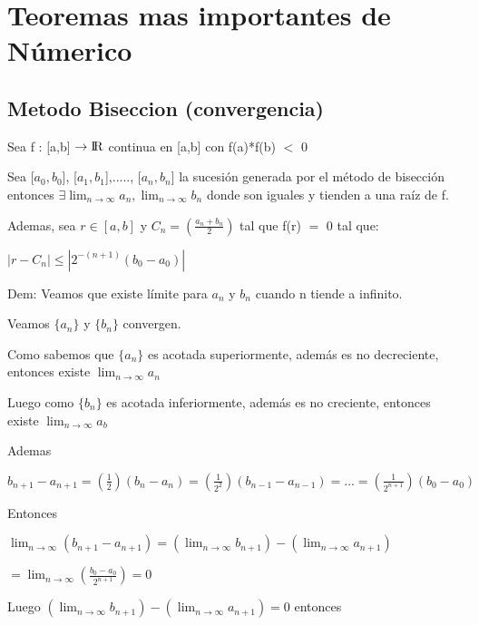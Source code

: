 \documentclass{article}
\begin{document}
\section{Teoremas mas importantes de Númerico}\label{Teoremas}

\subsection{Metodo Biseccion (convergencia)}\label{Metodo-Biseccion-(convergencia)}

Sea f : [a,b] $ \rightarrow {\rm I\!R}$ continua en [a,b] con f(a)*f(b) $<$ 0

Sea [$a_0,b_0$], [$a_1,b_1$],....., [$a_n,b_n$] la sucesión generada por el método de bisección entonces
$ \exists \lim_{n \to \infty} a_n, \lim_{n \to \infty} b_n $ donde son iguales y tienden a una raíz de f.

Ademas, sea $ r \in [a,b] $ y $ C_n =  \left( \displaystyle\frac{a_n+b_n}{2} \right) $ tal que f(r) $ = $ 0
tal que:

$| r - C_n | \leq | 2^{-(n+1)}(b_0 - a_0) |$

 \vspace{5mm}



Dem: Veamos que existe límite para $ a_n $ y $ b_n $ cuando n tiende a infinito.

Veamos $\{ a_n \}$ y $\{ b_n \}$ convergen.

Como sabemos que $\{ a_n \}$ es acotada superiormente, además es no decreciente, entonces existe
$\lim_{n \to \infty} a_n$

Luego como $\{ b_n \}$ es acotada inferiormente, además es no creciente, entonces existe
$\lim_{n \to \infty} a_b$

Ademas

$ b_{n+1} - a_{n+1} = \left( \displaystyle\frac{1}{2} \right) (b_{n} - a_{n}) = \left( \displaystyle\frac{1}{2^2} \right) (b_{n-1} - a_{n-1}) 
= ... =\left( \displaystyle\frac{1}{2^{n+1}} \right) (b_0 - a_0) $ 

Entonces

$\lim_{n \to \infty} ({b_{n+1}-a_{n+1}}) = {(\lim_{n \to \infty} b_{n+1}) -(\lim_{n \to \infty}a_{n+1})} $ 

$= \lim_{n \to \infty} \left( \displaystyle\frac{b_0-a_0}{2^{n+1}} \right) = 0$

 \vspace{5mm}

Luego $ {(\lim_{n \to \infty} b_{n+1}) -(\lim_{n \to \infty}a_{n+1})} = 0 $ entonces
\end{document}
